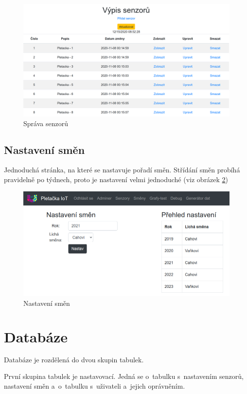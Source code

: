 \begin{figure}[htbp]
    \centering
    \includegraphics[width=\textwidth]{img/Edit.png}
    \caption{Správa senzorů}
    \label{fig:webSpravaSenzoru}
\end{figure}

\subsection{Nastavení směn}
Jednoduchá stránka, na které se nastavuje pořadí směn.
Střídání směn probíhá pravidelně po týdnech, proto je nastavení velmi jednoduché (viz obrázek \ref{fig:webSmeny})

\begin{figure}[htbp]
    \centering
    \includegraphics[width=\textwidth]{img/smeny.png}
    \caption{Nastavení směn}
    \label{fig:webSmeny}
\end{figure}

\section{Databáze}
Databáze je rozdělená do dvou skupin tabulek.

První skupina tabulek je nastavovací.
Jedná se o~tabulku s~nastavením senzorů, nastavení směn a~o~tabulku s~uživateli a~jejich oprávněním.

